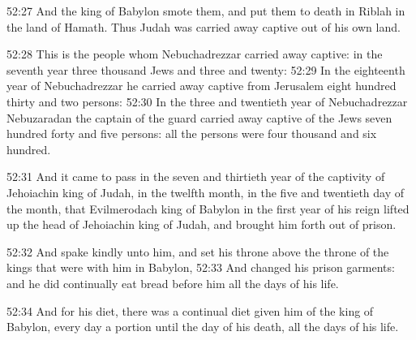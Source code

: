 52:27 And the king of Babylon smote them, and put them to death in Riblah in the land of Hamath. Thus Judah was carried away captive out of his own land.

52:28 This is the people whom Nebuchadrezzar carried away captive: in the seventh year three thousand Jews and three and twenty: 52:29 In the eighteenth year of Nebuchadrezzar he carried away captive from Jerusalem eight hundred thirty and two persons: 52:30 In the three and twentieth year of Nebuchadrezzar Nebuzaradan the captain of the guard carried away captive of the Jews seven hundred forty and five persons: all the persons were four thousand and six hundred.

52:31 And it came to pass in the seven and thirtieth year of the captivity of Jehoiachin king of Judah, in the twelfth month, in the five and twentieth day of the month, that Evilmerodach king of Babylon in the first year of his reign lifted up the head of Jehoiachin king of Judah, and brought him forth out of prison.

52:32 And spake kindly unto him, and set his throne above the throne of the kings that were with him in Babylon, 52:33 And changed his prison garments: and he did continually eat bread before him all the days of his life.

52:34 And for his diet, there was a continual diet given him of the king of Babylon, every day a portion until the day of his death, all the days of his life.

